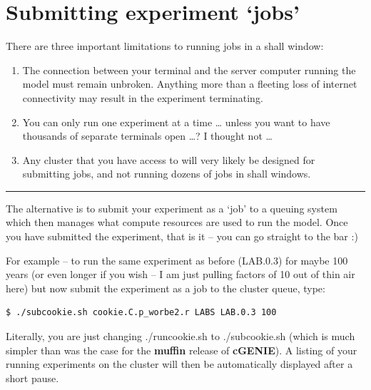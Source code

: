 \newpage

\section{Submitting experiment ‘jobs’}

There are three important limitations to running jobs in a shall window:
\begin{enumerate}[noitemsep]
\vspace{1mm}
\item The connection between your terminal and the server computer running the model must remain unbroken. Anything more than a fleeting loss of internet connectivity may result in the experiment terminating.
\vspace{1mm}
\item You can only run one experiment at a time … unless you want to have thousands of separate terminals open …? I thought not …
\vspace{1mm}
\item Any cluster that you have access to will very likely be designed for submitting jobs, and not running dozens of jobs in shall windows.
\end{enumerate}

\vspace{1mm}\noindent\rule{4cm}{0.1mm}\vspace{2mm}

\noindent The alternative is to submit your experiment as a ‘job’ to a queuing system which then manages what compute resources are used to run the model. Once you have submitted the experiment, that is it – you can go straight to the bar :)

\vspace{1mm}
For example -- to run the same experiment as before (\textsf{\footnotesize LAB.0.3}) for maybe 100 years (or even longer if you wish – I am just pulling factors of 10 out of thin air here) but now submit the experiment as a job to the cluster queue, type:
\vspace{-1mm}
\small\begin{verbatim}
$ ./subcookie.sh cookie.C.p_worbe2.r LABS LAB.0.3 100
\end{verbatim}\normalsize
\vspace{-1mm}

Literally, you are just changing \textsf{\footnotesize ./runcookie.sh} to \textsf{\footnotesize ./subcookie.sh} (which is much simpler than was the case for the \textbf{muffin} release of \textbf{cGENIE}). A listing of your running experiments on the cluster will then be automatically displayed after a short pause.

